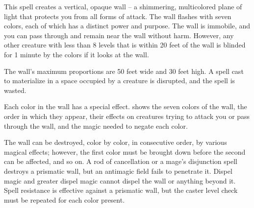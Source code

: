 \spelldur{\durshort \dismissable}
\spelleffect This spell creates a vertical, opaque wall -- a shimmering, multicolored plane of light that protects you from all forms of attack. The wall flashes with seven colors, each of which has a distinct power and purpose. The wall is immobile, and you can pass through and remain near the wall without harm. However, any other creature with less than 8 levels that is within 20 feet of the wall is blinded for 1 minute by the colors if it looks at the wall.
\par The wall's maximum proportions are 50 feet wide and 30 feet high. A  spell cast to materialize in a space occupied by a creature is disrupted, and the spell is wasted.
\par Each color in the wall has a special effect.  shows the seven colors of the wall, the order in which they appear, their effects on creatures trying to attack you or pass through the wall, and the magic needed to negate each color.
\par The wall can be destroyed, color by color, in consecutive order, by various magical effects; however, the first color must be brought down before the second can be affected, and so on. A rod of cancellation or a mage's disjunction spell destroys a prismatic wall, but an antimagic field fails to penetrate it. Dispel magic and greater dispel magic cannot dispel the wall or anything beyond it. Spell resistance is effective against a prismatic wall, but the caster level check must be repeated for each color present.
